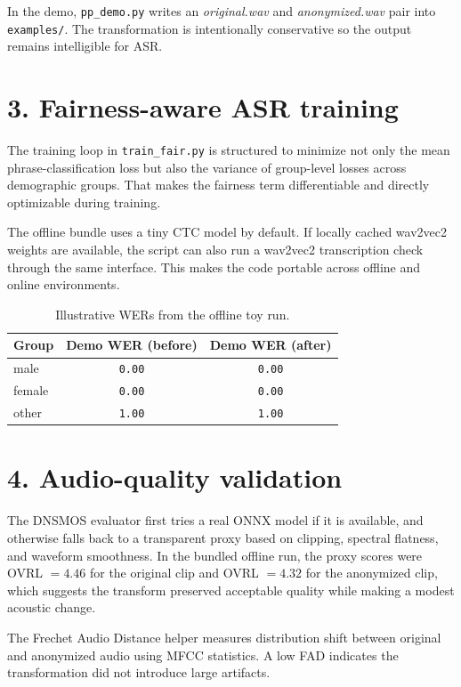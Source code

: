 \documentclass[10pt]{article}
\begin{document}
In the demo, \texttt{pp\_demo.py} writes an \emph{original.wav} and \emph{anonymized.wav} pair into \texttt{examples/}. The transformation is intentionally conservative so the output remains intelligible for ASR.

\section*{3. Fairness-aware ASR training}
The training loop in \texttt{train\_fair.py} is structured to minimize not only the mean phrase-classification loss but also the variance of group-level losses across demographic groups. That makes the fairness term differentiable and directly optimizable during training.

The offline bundle uses a tiny CTC model by default. If locally cached wav2vec2 weights are available, the script can also run a wav2vec2 transcription check through the same interface. This makes the code portable across offline and online environments.

\begin{table}[h]
\centering
\small
\begin{tabular}{lcc}
\toprule
Group & Demo WER (before) & Demo WER (after) \\
\midrule
male & \texttt{0.00} & \texttt{0.00} \\
female & \texttt{0.00} & \texttt{0.00} \\
other & \texttt{1.00} & \texttt{1.00} \\
\bottomrule
\end{tabular}
\caption{Illustrative WERs from the offline toy run.}
\end{table}

\section*{4. Audio-quality validation}
The DNSMOS evaluator first tries a real ONNX model if it is available, and otherwise falls back to a transparent proxy based on clipping, spectral flatness, and waveform smoothness. In the bundled offline run, the proxy scores were OVRL $= 4.46$ for the original clip and OVRL $= 4.32$ for the anonymized clip, which suggests the transform preserved acceptable quality while making a modest acoustic change.

The Frechet Audio Distance helper measures distribution shift between original and anonymized audio using MFCC statistics. A low FAD indicates the transformation did not introduce large artifacts.
\end{document}
